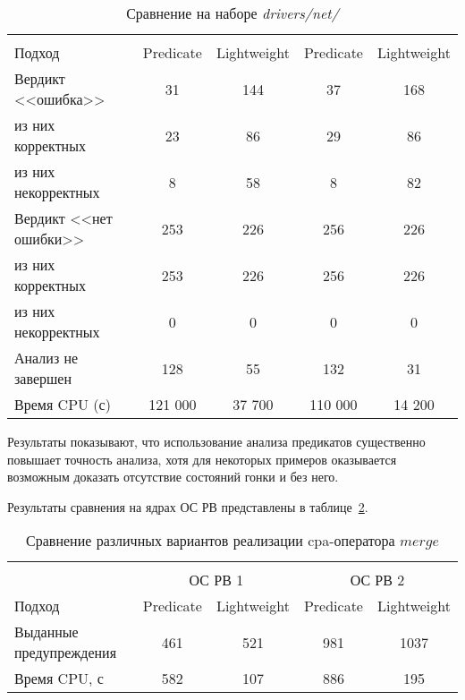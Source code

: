   \begin{table}[h]\footnotesize \centering
    \caption{Сравнение на наборе \textit{drivers/net/}}
  	\label{table-drivers-predicate}
    \begin{tabular}{ | l | c | c | c | c |}
      \hline
      & 			 \multicolumn{2}{c|}{\theoryraces} & 	\multicolumn{2}{c|}{\combatmode}\\
      Подход         				& Predicate & Lightweight 	& Predicate & Lightweight\\ \hline
      Вердикт <<ошибка>> 			& 31   		& 144   	& 37   		& 168  	\\ 
  \hspace{0.5cm} из них корректных 	& 23 		& 86 		& 29   		& 86 	\\ 
  \hspace{0.5cm} из них некорректных & 8 		& 58 		& 8   		& 82 	\\ \hline
      Вердикт <<нет ошибки>>  		& 253    	& 226    	& 256   	& 226 	\\ 
  \hspace{0.5cm} из них корректных 	& 253 		& 226    	& 256   	& 226 	\\
  \hspace{0.5cm} из них некорректных & 0 		& 0    		& 0   		& 0 	\\ \hline
      Анализ не завершен       		& 128    	& 55    	& 132   	& 31  	\\ \hline
      Время CPU (с)   				& 121 000 	& 37 700 	& 110 000  	& 14 200\\ 
      \hline
    \end{tabular}
  \end{table}

Результаты показывают, что использование анализа предикатов существенно повышает точность анализа, хотя для некоторых примеров оказывается возможным доказать отсутствие состояний гонки и без него.

Результаты сравнения на ядрах ОС РВ представлены в таблице~\ref{table-os-predicate}.

  \begin{table}[h] \footnotesize \centering
    \caption{Сравнение различных вариантов реализации cpa-оператора $merge$}
  	\label{table-os-predicate}
    \begin{tabular}{ | l | c | c | c | c |  }
      \hline
      		& 		\multicolumn{4}{c|}{\combatmode}  \\
      		& 			 \multicolumn{2}{c|}{ОС РВ 1} & 	\multicolumn{2}{c|}{ОС РВ 2}\\
      Подход         					& Predicate  & Lightweight 	& Predicate  & Lightweight 	\\ \hline
      Выданные предупреждения			& 461   	& 521    		& 981   	& 1037  			\\ 
  	  Время CPU, с 						& 582   	& 107  			& 886   	& 195  		\\ 
      \hline
    \end{tabular}
  \end{table}
  
